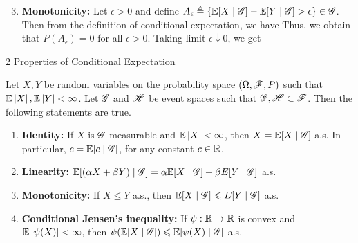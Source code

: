 \documentclass[12pt,aspectratio=169]{beamer}
\begin{document}
\begin{frame}
\begin{Proof}
\begin{enumerate}
\setcounter{enumi}{2}
\item \textbf{Monotonicity:} Let $\epsilon > 0$ and define $A_\epsilon \triangleq \left\{\mathbb{E}[X\mid\mathscr{G}] - \mathbb{E}[Y\mid \mathscr{G}] >\epsilon\right\} \in  \mathscr{G}$.  
Then from the definition of conditional expectation, we have 
Thus, we obtain  that $P(A_\epsilon) = 0$ for all $\epsilon > 0$. 
Taking limit $\epsilon \downarrow 0$, we get 
\end{enumerate}
\end{Proof}
\end{frame}

\begin{frame}{2 Properties of Conditional Expectation}
\begin{prop} 
Let $X,Y$ be random variables on the probability space $(\Omega, \mathscr{F}, P)$ such that $\mathbb{E}\left\lvert X\right\rvert , \mathbb{E}\left\lvert Y\right\rvert < \infty$. 
Let $\mathscr{G}$ and $\mathscr{H}$ be event spaces such that $\mathscr{G}, \mathscr{H} \subset \mathscr{F}$. 
Then the following statements are true. 
\begin{enumerate}
\item \textbf{Identity:} If $X$ is $\mathscr{G}$-measurable and $\mathbb{E}\left\lvert X\right\rvert < \infty$, then $X = \mathbb{E}[X\mid\mathscr{G}]$ a.s. 
In particular, $c = \mathbb{E}[c\mid \mathscr{G}]$, for any constant $c \in  \mathbb{R}$. 
\item \textbf{Linearity:} $\mathbb{E}[(\alpha X + \beta Y) \mid \mathscr{G}] = \alpha \mathbb{E}[X\mid\mathscr{G}] + \beta E[Y\mid \mathscr{G}]$ a.s.
\item \textbf{Monotonicity:} If $X \le Y$ a.s., then $\mathbb{E}[X\mid\mathscr{G}] \leqslant E[Y\mid \mathscr{G}]$ a.s.
\item \textbf{Conditional Jensen's inequality:} If $\psi : \mathbb{R} \to  \mathbb{R}$ is convex and $\mathbb{E}\left\lvert\psi(X)\right\rvert <\infty$, 
then $\psi(\mathbb{E}[X\mid\mathscr{G}]) \leqslant \mathbb{E}[\psi(X) \mid \mathscr{G}]$ a.s. 
\end{enumerate}
\end{prop}
\end{frame}
\end{document}

